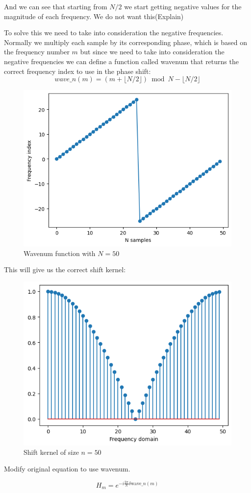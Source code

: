 \documentclass[]{usiinfbachelorproject}
\begin{document}
	And we can see that starting from $N/2$ we start getting negative values for the magnitude of each frequency. We do not want this(Explain)
	
	To solve this we need to take into consideration the negative frequencies.
	Normally we multiply each sample by its corresponding phase, which is based on the frequency number $m$
	but since we need to take into consideration the negative frequencies we can define a function called wavenum that returns the correct frequency index to use in the phase shift:
	\begin{equation*}
		wave\_n(m) = (m + \lfloor N/2 \rfloor ) \bmod N - \lfloor N/2 \rfloor
	\end{equation*}

	\begin{figure}[h]
		\centering
		\includegraphics[width=0.5\columnwidth]{images/wavenum_n50.png}
		\caption{Wavenum function with $N=50$}
	\end{figure}
	
	This will give us the correct shift kernel:
	\begin{figure}[h]
		\centering
		\includegraphics[width=0.5\columnwidth]{images/Results/good_shift_filter.png}
		\caption{Shift kernel of size $n=50$}
	\end{figure}
	
	
	
	Modify original equation to use wavenum.
	
	\begin{equation*}
		H_m = e^{-i \frac{2\pi}{N}  \delta \text{wave}\_n(m)}
	\end{equation*}
	
\end{document}
